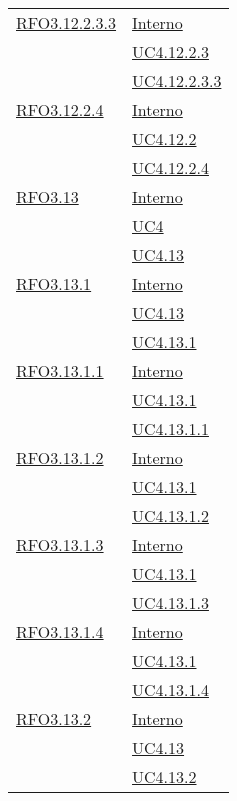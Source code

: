 \begin{longtable}{|>{\centering}m{5cm}|m{5cm}<{\centering}|}
\hyperlink{RFO3.12.2.3.3}{RFO3.12.2.3.3} &  \hyperlink{Interno}{Interno}\\ &\hyperref[UC4.12.2.3]{UC4.12.2.3}\\ &\hyperref[UC4.12.2.3.3]{UC4.12.2.3.3}\\ \hline

\hyperlink{RFO3.12.2.4}{RFO3.12.2.4} &  \hyperlink{Interno}{Interno}\\ &\hyperref[UC4.12.2]{UC4.12.2}\\ &\hyperref[UC4.12.2.4]{UC4.12.2.4}\\ \hline

\hyperlink{RFO3.13}{RFO3.13} & \hyperlink{Interno}{Interno}\\ &\hyperref[UC4]{UC4}\\ &\hyperref[UC4.13]{UC4.13}\\ \hline

\hyperlink{RFO3.13.1}{RFO3.13.1} & \hyperlink{Interno}{Interno}\\ &\hyperref[UC4.13]{UC4.13}\\ &\hyperref[UC4.13.1]{UC4.13.1}\\ \hline

\hyperlink{RFO3.13.1.1}{RFO3.13.1.1} &  \hyperlink{Interno}{Interno}\\ &\hyperref[UC4.13.1]{UC4.13.1}\\ &\hyperref[UC4.13.1.1]{UC4.13.1.1}\\ \hline

\hyperlink{RFO3.13.1.2}{RFO3.13.1.2} & \hyperlink{Interno}{Interno}\\ &\hyperref[UC4.13.1]{UC4.13.1}\\ &\hyperref[UC4.13.1.2]{UC4.13.1.2}\\ \hline

\hyperlink{RFO3.13.1.3}{RFO3.13.1.3} &  \hyperlink{Interno}{Interno}\\ &\hyperref[UC4.13.1]{UC4.13.1}\\ &\hyperref[UC4.13.1.3]{UC4.13.1.3}\\ \hline

\hyperlink{RFO3.13.1.4}{RFO3.13.1.4} &  \hyperlink{Interno}{Interno}\\ &\hyperref[UC4.13.1]{UC4.13.1}\\ &\hyperref[UC4.13.1.4]{UC4.13.1.4}\\ \hline

\hyperlink{RFO3.13.2}{RFO3.13.2} & \hyperlink{Interno}{Interno}\\ &\hyperref[UC4.13]{UC4.13}\\ &\hyperref[UC4.13.2]{UC4.13.2}\\ \hline


\end{longtable}

